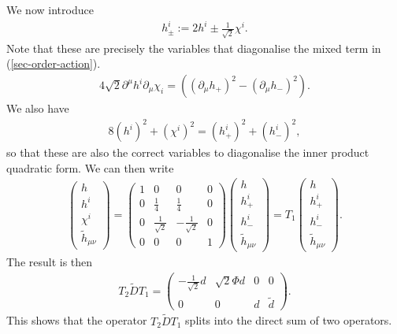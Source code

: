 \documentclass[10pt]{report}
\theoremstyle{definition}
\begin{document}
We now introduce
\begin{align}
h_\pm^i := 2 h^i \pm \frac{1}{\sqrt{2}} \chi^i.
\end{align}
Note that these are precisely the variables that diagonalise the mixed term in (\ref{sec-order-action}). 
\begin{align}
4 \sqrt{2} \partial^\mu h^i \partial_\mu \chi_i =  ( ( \partial_\mu h_+)^2 -  ( \partial_\mu h_-)^2).
\end{align}
We also have
\begin{align}
8 (h^i)^2 + (\chi^i)^2 = (h_+^i)^2 + (h_-^i)^2,
\end{align}
so that these are also the correct variables to diagonalise the inner product quadratic form. We can then write
\begin{align}
\left( \begin{array}{c} h\\ h^i \\ \chi^i \\ \tilde{h}_{\mu\nu} \end{array}\right) = 
 \left( \begin{array}{cccc}  1& 0 & 0 & 0 \\ 0 & \frac{1}{4} & \frac{1}{4} & 0 \\ 0&  \frac{1}{\sqrt{2}} & - \frac{1}{\sqrt{2}} &0 \\ 0 & 0 & 0 & 1 \end{array} \right) \left( \begin{array}{c} h\\ h^i_+ \\ h^i_- \\ \tilde{h}_{\mu\nu} \end{array} \right) = T_1  \left( \begin{array}{c} h\\ h^i_+ \\ h^i_- \\ \tilde{h}_{\mu\nu} \end{array} \right) .
\end{align}
The result is then
\begin{align}
T_2 \tilde{D} T_1 = \left(\begin{array}{cccc} - \frac{1}{\sqrt{2}} d & \sqrt{2} \Phi d & 0 & 0 \\
0 & 0 &d & \tilde{d} \end{array}\right).
\end{align}
This shows that the operator $T_2 \tilde{D} T_1$ splits into the direct sum of two operators. 
\end{document}
